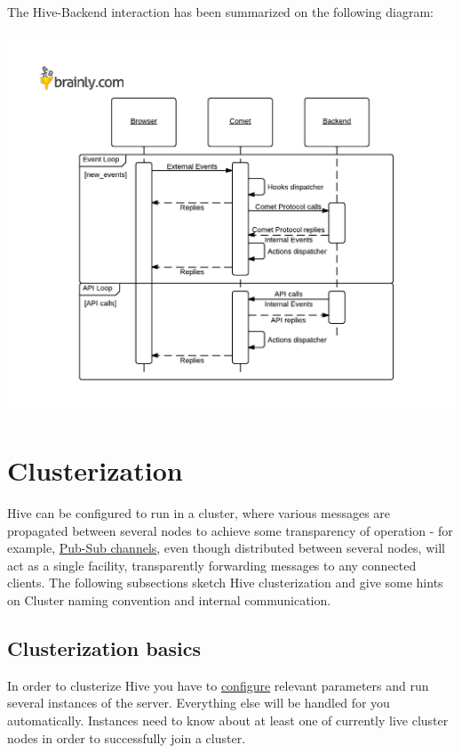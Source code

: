 \documentclass[a4paper]{article}
\begin{document}
\noindent
The Hive-Backend interaction has been summarized on the following diagram:

\begin{center}
\includegraphics[scale=1.0]{./img/hive_usage.pdf}
\end{center}

\pagebreak
\section{Clusterization}
\label{sec-8}
\label{ref-cluster}

Hive can be configured to run in a cluster, where various messages are propagated between several nodes to achieve some transparency of operation - for example, \hyperref[sec-7-3]{Pub-Sub channels}, even though distributed between several nodes, will act as a single facility, transparently forwarding messages to any connected clients.
The following subsections sketch Hive clusterization and give some hints on Cluster naming convention and internal communication.
\subsection{Clusterization basics}
\label{sec-8-1}

In order to clusterize Hive you have to \hyperref[ref-cluster-config]{configure} relevant parameters and run several instances of the server. Everything else will be handled for you automatically. Instances need to know about at least one of currently live cluster nodes in order to successfully join a cluster.
\end{document}
